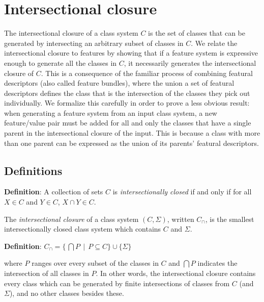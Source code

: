 \documentclass[12pt, oneside]{article}   	%
\begin{document}
\FloatBarrier
\section{Intersectional closure}
\label{sec:intersectional}

The intersectional closure of a class system $C$ is the set of classes that can be generated by intersecting an arbitrary subset of classes in $C$. We relate the intersectional closure to features by showing that if a feature system is expressive enough to generate all the classes in $C$, it necessarily generates the intersectional closure of $C$. This is a consequence of the familiar process of combining featural descriptors (also called feature bundles), where the union a set of featural descriptors defines the class that is the intersection of the classes they pick out individually. We formalize this carefully in order to prove a less obvious result: when generating a feature system from an input class system, a new feature/value pair must be added for all and only the classes that have a single parent in the intersectional closure of the input. This is because a class with more than one parent can be expressed as the union of its parents' featural descriptors.

\subsection{Definitions}

\textbf{Definition}: A collection of sets $C$ is \textit{intersectionally closed} if and only if for all $X \in C$ and $Y \in C$, $X \cap Y \in C$.

\vspace{0.5\baselineskip} \noindent The \textit{intersectional closure} of a class system $(C, \Sigma)$, written $C_\cap$, is the smallest intersectionally closed class system which contains $C$ and $\Sigma$.

\vspace{0.5\baselineskip} \noindent \textbf{Definition}: $C_\cap = \{ \, \bigcap P \, \mid \, P \subseteq C\} \cup \{\Sigma\}$

\vspace{0.5\baselineskip} \noindent where $P$ ranges over every subset of the classes in $C$ and $\bigcap P$ indicates the intersection of all classes in $P$. In other words, the intersectional closure contains every class which can be generated by finite intersections of classes from $C$ (and $\Sigma$), and no other classes besides these.
\end{document}
